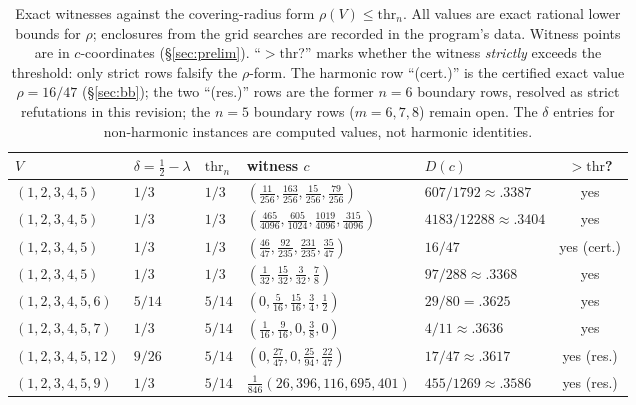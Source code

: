 \begin{table}[htbp]
\centering
\footnotesize
\caption{Exact witnesses against the covering-radius form
$\rho(V)\le\mathrm{thr}_n$. All values are exact rational lower bounds
for $\rho$; enclosures from the grid searches are recorded in the
program's data. Witness points are in $c$-coordinates
(\S\ref{sec:prelim}). ``$>\mathrm{thr}$?'' marks whether the witness
\emph{strictly} exceeds the threshold: only strict rows falsify the
$\rho$-form. The harmonic row ``(cert.)'' is the certified exact value
$\rho=16/47$ (\S\ref{sec:bb}); the two ``(res.)'' rows are the former
$n=6$ boundary rows, resolved as strict refutations in this revision;
the $n=5$ boundary rows ($m=6,7,8$) remain open. The
$\delta$ entries for non-harmonic instances are computed values, not
harmonic identities.}
\label{tab:refute}
\begin{tabularx}{\textwidth}{@{} l l l >{\raggedright\arraybackslash}X l c @{}}
\toprule
$V$ & $\delta=\tfrac12-\lambda$ & $\mathrm{thr}_n$ & witness $c$ &
$D(c)$ & $>\mathrm{thr}$? \\
\midrule
$(1,2,3,4,5)$ & $1/3$ & $1/3$ &
$(\tfrac{11}{256},\tfrac{163}{256},\tfrac{15}{256},\tfrac{79}{256})$ &
$607/1792{\approx}.3387$ & yes \\
$(1,2,3,4,5)$ & $1/3$ & $1/3$ &
$(\tfrac{465}{4096},\tfrac{605}{1024},\tfrac{1019}{4096},
\tfrac{315}{4096})$ &
$4183/12288{\approx}.3404$ & yes \\
$(1,2,3,4,5)$ & $1/3$ & $1/3$ &
$(\tfrac{46}{47},\tfrac{92}{235},\tfrac{231}{235},\tfrac{35}{47})$ &
$16/47$ & yes (cert.) \\
$(1,2,3,4,5)$ & $1/3$ & $1/3$ &
$(\tfrac1{32},\tfrac{15}{32},\tfrac3{32},\tfrac78)$ &
$97/288{\approx}.3368$ & yes \\
$(1,2,3,4,5,6)$ & $5/14$ & $5/14$ &
$(0,\tfrac5{16},\tfrac{15}{16},\tfrac34,\tfrac12)$ & $29/80=.3625$ &
yes \\
$(1,2,3,4,5,7)$ & $1/3$ & $5/14$ &
$(\tfrac1{16},\tfrac9{16},0,\tfrac38,0)$ & $4/11{\approx}.3636$ & yes
\\
$(1,2,3,4,5,12)$ & $9/26$ & $5/14$ &
$(0,\tfrac{27}{47},0,\tfrac{25}{94},\tfrac{22}{47})$ &
$17/47{\approx}.3617$ & yes (res.) \\
$(1,2,3,4,5,9)$ & $1/3$ & $5/14$ &
$\tfrac1{846}(26,396,116,695,401)$ &
$455/1269{\approx}.3586$ & yes (res.) \\
\bottomrule
\end{tabularx}
\end{table}

